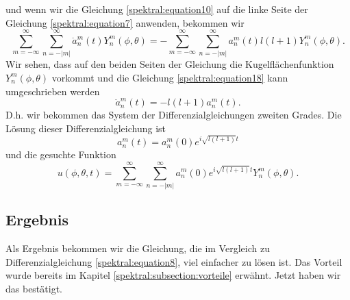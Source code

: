 und wenn wir die Gleichung \eqref{spektral:equation10} auf die linke Seite der Gleichung \eqref{spektral:equation7} anwenden, bekommen wir
\begin{equation}
\sum_{m=-\infty}^{\infty}\sum_{n=-|m|}^{\infty}\ddot{a}_n^m(t)Y_n^m(\phi, \theta) = -\sum_{m=-\infty}^{\infty}\sum_{n=-|m|}^{\infty}a_n^m(t)l(l+1)Y_n^m(\phi, \theta).
\label{spektral:equation18}
\end{equation}
Wir sehen, dass auf den beiden Seiten der Gleichung die Kugelflächenfunktion $Y_n^m(\phi, \theta)$ vorkommt und die Gleichung \eqref{spektral:equation18} kann umgeschrieben werden
\begin{equation}
\ddot{a}_n^m(t) = -l(l+1)a_n^m(t).
\label{spektral:equation19}
\end{equation}
D.h. wir bekommen das System der Differenzialgleichungen zweiten Grades.
Die Lösung dieser Differenzialgleichung ist
\begin{equation}
a_n^m(t) = a_n^m(0)e^{i\sqrt{l(l+1)}t}
\label{spektral:equation20}
\end{equation}
und die gesuchte Funktion
\begin{equation}
u(\phi, \theta, t) = \sum_{m=-\infty}^{\infty}\sum_{n=-|m|}^{\infty}a_n^m(0)e^{i\sqrt{l(l+1)}t}Y_n^m(\phi, \theta).
\label{spektral:equation21}
\end{equation}

\subsection{Ergebnis
\label{spektral:subsection:ergebnis}}

Als Ergebnis bekommen wir die Gleichung, die im Vergleich zu Differenzialgleichung \eqref{spektral:equation8}, viel einfacher zu lösen ist. Das Vorteil wurde bereits im Kapitel \ref{spektral:subsection:vorteile} erwähnt. Jetzt haben wir das bestätigt.